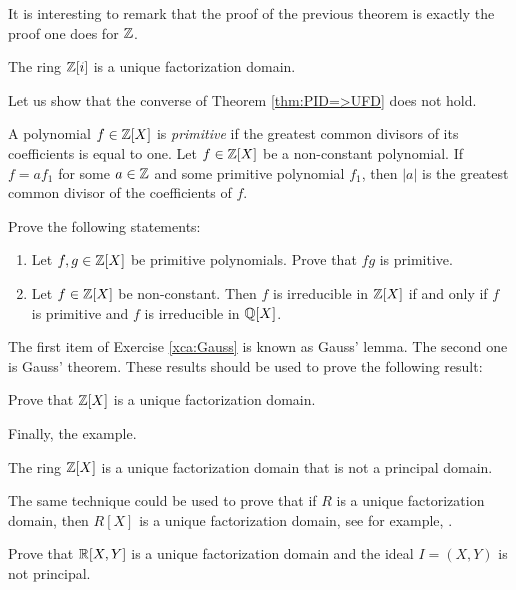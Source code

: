 It is interesting to remark that the proof 
of the previous theorem is exactly the proof
one does for $\mathbb{Z}$. 

\begin{example}
	The ring $\mathbb{Z}[i]$ is a unique factorization domain. 	
\end{example}

Let us show that the converse of Theorem \ref{thm:PID=>UFD} does not hold. 

\begin{exercise}
\label{xca:content}
	A polynomial $f\in\mathbb{Z}[X]$ is \emph{primitive} if
	the greatest common divisors of its coefficients is equal to one. 
	Let $f\in\mathbb{Z}[X]$ be a non-constant polynomial. If $f=af_1$ for some $a\in\mathbb{Z}$ and some
	primitive polynomial $f_1$, then $|a|$ is the greatest common divisor of the coefficients of $f$. 	
\end{exercise}

\begin{exercise}
\label{xca:Gauss}
Prove the following statements:
\begin{enumerate}
    \item Let $f,g\in\mathbb{Z}[X]$ be primitive polynomials. Prove that $fg$ is primitive.
    \item Let $f\in\mathbb{Z}[X]$ be non-constant. Then
$f$ is irreducible in $\mathbb{Z}[X]$ if and only if $f$ is primitive and 
$f$ is irreducible in $\mathbb{Q}[X]$. 
\end{enumerate}
\end{exercise}

The first item of Exercise \ref{xca:Gauss} is known as Gauss' lemma.
The second one is Gauss' theorem. These results should be used to prove
the following result: 

\begin{exercise}
\label{xca:Z[X]_UFD}
    Prove that $\mathbb{Z}[X]$ is a unique factorization domain. 
\end{exercise}

Finally, the example. 

\begin{example}
	The ring $\mathbb{Z}[X]$ is a unique factorization 
	domain that is not a principal domain. 	
\end{example}

The same technique could be used to prove that if 
$R$ is a unique factorization domain, then $R[X]$ 
is a unique factorization domain, see
for example, \cite[Chapter III, Theorem 6.14]{MR600654}.  

\begin{exercise}
    Prove that $\mathbb{R}[X,Y]$ is a unique factorization domain 
    and the ideal $I=(X,Y)$ is not principal. 
\end{exercise}

